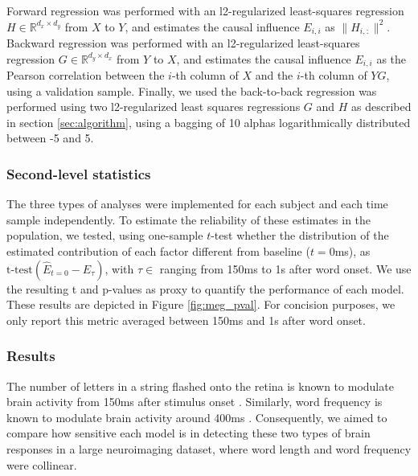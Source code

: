 Forward regression was performed with an l2-regularized least-squares regression $H \in \mathbb{R}^{d_x \times d_y}$ from $X$ to $Y$, and estimates the causal influence $E_{i,i}$ as $\| H_{i, :} \|^2$.
%
Backward regression was performed with an l2-regularized least-squares regression $G \in \mathbb{R}^{d_y \times d_x}$ from $Y$ to $X$, and estimates the causal influence $E_{i, i}$ as the Pearson correlation between the $i$-th column of $X$ and the $i$-th column of $YG$, using a validation sample.
%
Finally, we used the back-to-back regression was performed using two l2-regularized
least squares regressions $G$ and $H$ as described in section \ref{sec:algorithm}, using a bagging of 10 alphas logarithmically distributed between -5 and 5.

\subsubsection{Second-level statistics}

The three types of analyses were implemented for each subject and each time
sample independently. To estimate the reliability of these estimates in the
population, we tested, using one-sample $t$-test whether the distribution of
the estimated contribution of each factor different from baseline ($t=0$ms),
as $\text{t-test}(\hat E_{t=0} - \hat E_{\tau})$, with $\tau \in $ ranging from
150ms to 1s after word onset. We use the resulting t and p-values as proxy to
quantify the performance of each model. These results are depicted in Figure
\ref{fig:meg_pval}. For concision purposes, we only report this metric averaged
between 150ms and 1s after word onset.

\subsubsection{Results}
The number of letters in a string flashed onto the retina is known to modulate
brain activity from 150ms after stimulus onset \cite{pegado2014timing}.
Similarly, word frequency is known to modulate brain activity around 400ms
\cite{kutas2011thirty}. Consequently, we aimed to compare how sensitive each
model is in detecting these two types of brain responses in a large
neuroimaging dataset, where word length and word frequency were collinear.

